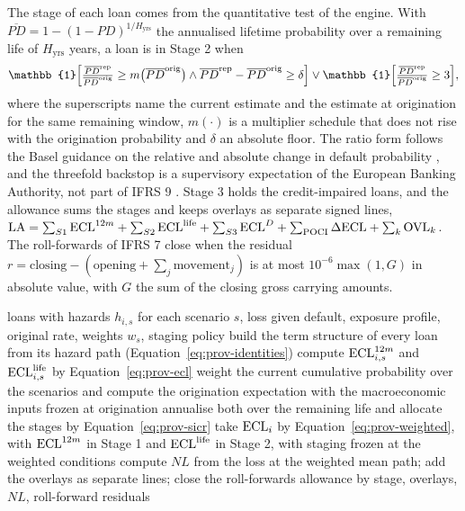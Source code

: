 The stage of each loan comes from the quantitative test of the engine. With $\overline{PD}=1-(1-PD)^{1/H_{\mathrm{yrs}}}$ the annualised lifetime probability over a remaining life of $H_{\mathrm{yrs}}$ years, a loan is in Stage 2 when
\begin{equation}
\mathbb{1}\Bigl[\tfrac{\overline{PD}^{\mathrm{rep}}}{\overline{PD}^{\mathrm{orig}}}\ge m\bigl(\overline{PD}^{\mathrm{orig}}\bigr)\wedge \overline{PD}^{\mathrm{rep}}-\overline{PD}^{\mathrm{orig}}\ge\delta\Bigr]\vee
\mathbb{1}\Bigl[\tfrac{\overline{PD}^{\mathrm{rep}}}{\overline{PD}^{\mathrm{orig}}}\ge3\Bigr],
\label{eq:prov-sicr}
\end{equation}
where the superscripts name the current estimate and the estimate at origination for the same remaining window, $m(\cdot)$ is a multiplier schedule that does not rise with the origination probability and $\delta$ an absolute floor. The ratio form follows the Basel guidance on the relative and absolute change in default probability \citep{provisions:bcbs2015}, and the threefold backstop is a supervisory
expectation of the European Banking Authority, not part of IFRS 9 \citep{provisions:eba2023}. Stage 3 holds the credit-impaired loans, and the allowance sums the stages and keeps overlays as separate signed lines,
$\mathrm{LA}=\sum_{S1}\mathrm{ECL}^{12m}+\sum_{S2}\mathrm{ECL}^{\mathrm{life}}+\sum_{S3}\mathrm{ECL}^{D}+\sum_{\mathrm{POCI}}\Delta\mathrm{ECL}+\sum_k\mathrm{OVL}_k$. The roll-forwards of IFRS 7 close when the residual
$r=\mathrm{closing}-(\mathrm{opening}+\sum_j\mathrm{movement}_j)$ is at most $10^{-6}\max(1,G)$ in absolute value, with $G$ the sum of the closing gross carrying amounts.

\begin{algorithm}[htbp]
\caption{The expected credit loss of a portfolio at a reporting date (cases C06 and C07).}
\label{alg:prov-ecl}
\begin{algorithmic}[1]
\Require loans with hazards $h_{i,s}$ for each scenario $s$, loss given default, exposure profile, original rate, weights $w_s$, staging policy
  \State build the term structure of every loan from its hazard path (Equation~\ref{eq:prov-identities})
  \State compute $\mathrm{ECL}^{12m}_{i,s}$ and $\mathrm{ECL}^{\mathrm{life}}_{i,s}$ by Equation~\ref{eq:prov-ecl}
\EndFor
\State weight the current cumulative probability over the scenarios and compute the origination expectation with the macroeconomic inputs frozen at origination
\State annualise both over the remaining life and allocate the stages by Equation~\ref{eq:prov-sicr}
\State take $\mathrm{ECL}_i$ by Equation~\ref{eq:prov-weighted}, with $\mathrm{ECL}^{12m}$ in Stage 1 and $\mathrm{ECL}^{\mathrm{life}}$ in Stage 2, with staging frozen at the weighted conditions
\State compute $NL$ from the loss at the weighted mean path; add the overlays as separate lines; close the roll-forwards
\Ensure allowance by stage, overlays, $NL$, roll-forward residuals
\end{algorithmic}
\end{algorithm}

